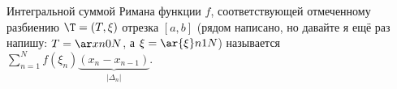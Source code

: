 
 Интегральной суммой Римана функции $f$, соответствующей отмеченному разбиению $\T=(T,\xi)$ отрезка $[a,b]$ (рядом написано, но
 давайте я ещё раз напишу: $T=\ar xn0N$, а $\xi=\ar{\xi}n1N$) называется
 $\sum\limits_{n=1}^Nf(\xi_n)\underbrace{(x_n-x_{n-1})}_{|\Delta_n|}$.
 